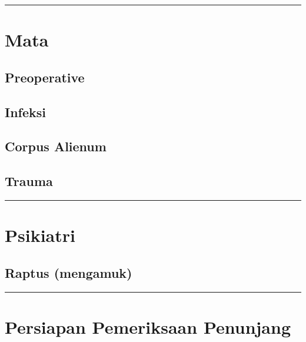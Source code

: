\documentclass[
]{book}
\begin{document}
\begin{center}\rule{0.5\linewidth}{0.5pt}\end{center}

\hypertarget{mata}{%
\section{Mata}\label{mata}}

\hypertarget{preoperative-2}{%
\subsection{Preoperative}\label{preoperative-2}}

\hypertarget{infeksi-5}{%
\subsection{Infeksi}\label{infeksi-5}}

\hypertarget{corpus-alienum-1}{%
\subsection{Corpus Alienum}\label{corpus-alienum-1}}

\hypertarget{trauma-2}{%
\subsection{Trauma}\label{trauma-2}}

\begin{center}\rule{0.5\linewidth}{0.5pt}\end{center}

\hypertarget{psikiatri}{%
\section{Psikiatri}\label{psikiatri}}

\hypertarget{raptus-mengamuk}{%
\subsection{Raptus (mengamuk)}\label{raptus-mengamuk}}

\begin{center}\rule{0.5\linewidth}{0.5pt}\end{center}

\hypertarget{persiapan-pemeriksaan-penunjang}{%
\section{Persiapan Pemeriksaan Penunjang}\label{persiapan-pemeriksaan-penunjang}}
\end{document}
